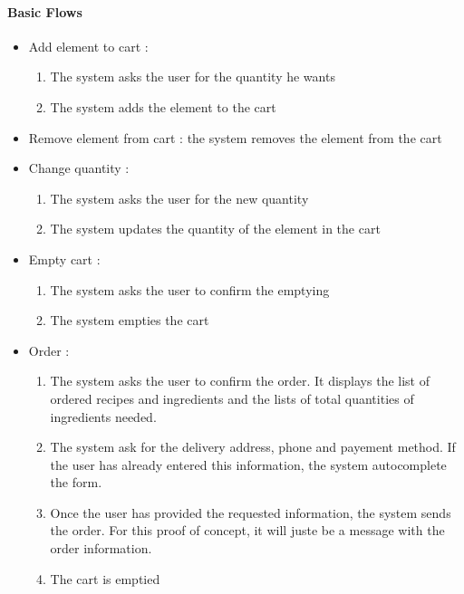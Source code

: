 {  \paragraph{Basic Flows}
  \begin{itemize}
    \item Add element to cart :
    \begin{enumerate}
      \item The system asks the user for the quantity he wants
      \item The system adds the element to the cart
    \end{enumerate}
    \item Remove element from cart : the system removes the element from the cart
    \item Change quantity :
    \begin{enumerate}
      \item The system asks the user for the new quantity
      \item The system updates the quantity of the element in the cart
    \end{enumerate}
    \item Empty cart :
    \begin{enumerate}
      \item The system asks the user to confirm the emptying
      \item The system empties the cart
    \end{enumerate}
    \item Order :
    \begin{enumerate}
      \item The system asks the user to confirm the order. It displays the list of ordered recipes and ingredients and the lists of total quantities of ingredients needed.
      \item The system ask for the delivery address, phone and payement method. If the user has already entered this information, the system autocomplete the form.
      \item Once the user has provided the requested information, the system sends the order. For this proof of concept, it will juste be a message with the order information.
      \item The cart is emptied
    \end{enumerate}
  \end{itemize}

}

